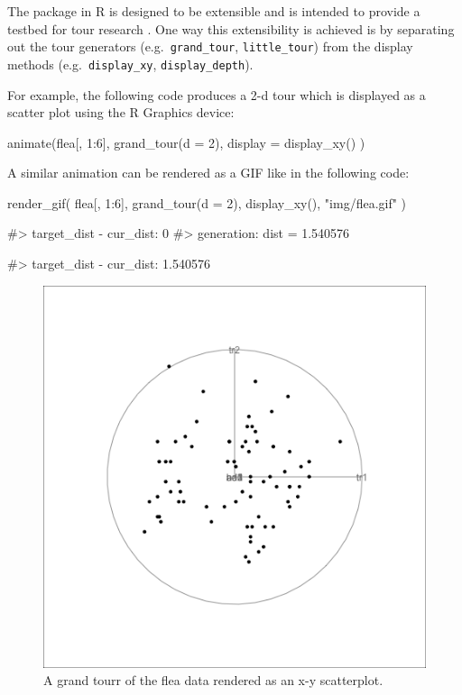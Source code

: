 The  package in R is designed to be extensible and is
intended to provide a testbed for tour research \citep{tourr2011}. One
way this extensibility is achieved is by separating out the tour
generators (e.g.~\texttt{grand\_tour}, \texttt{little\_tour}) from the
display methods (e.g.~\texttt{display\_xy}, \texttt{display\_depth}).

For example, the following code produces a 2-d tour which is displayed
as a scatter plot using the R Graphics device:

\begin{Schunk}
\begin{Sinput}
animate(flea[, 1:6],
  grand_tour(d = 2),
  display = display_xy()
)
\end{Sinput}
\end{Schunk}

A similar animation can be rendered as a GIF like in the following code:

\begin{Schunk}
\begin{Sinput}
render_gif(
  flea[, 1:6],
  grand_tour(d = 2),
  display_xy(),
  "img/flea.gif"
)
\end{Sinput}
\end{Schunk}

\begin{Schunk}
\begin{Soutput}
#> target_dist - cur_dist: 0 
#> generation:  dist =   1.540576
\end{Soutput}
\begin{Soutput}
#> target_dist - cur_dist: 1.540576
\end{Soutput}
\begin{figure}
\includegraphics[width=\textwidth]{img/flea} \caption[A grand tourr of the flea data rendered as an x-y scatterplot]{A grand tourr of the flea data rendered as an x-y scatterplot.}\label{fig:flea-tourr}
\end{figure}
\end{Schunk}

